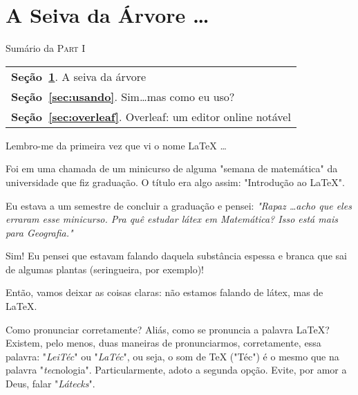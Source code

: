 \section{A Seiva da Árvore \ldots}\label{sec:seiva} %

\begin{margintable}\vspace{.8in}\footnotesize
  \caption{Sumário da \textsc{Part I}} 
  \medskip  
  \begin{tabularx}{\marginparwidth}{|X}
    \textbf{\sffamily \textcolor{azulUFRB}{Seção}~\ref{sec:seiva}}.    {\sffamily A seiva da árvore}                  \\
    \textbf{\sffamily \textcolor{azulUFRB}{Seção}~\ref{sec:usando}}.   {\sffamily Sim\ldots mas como eu uso?}         \\
    \textbf{\sffamily \textcolor{azulUFRB}{Seção}~\ref{sec:overleaf}}. {\sffamily Overleaf: um editor online notável} \\
  \end{tabularx}
\end{margintable}

Lembro-me da primeira vez que vi o nome \LaTeX{} \ldots

Foi em uma chamada de um minicurso de alguma "semana de matemática" da 
universidade que fiz graduação.
O título era algo assim: "Introdução ao \LaTeX".

Eu estava a um semestre de concluir a graduação e pensei: 
\textit{
  "Rapaz \ldots acho que eles erraram esse minicurso. 
  Pra quê estudar látex em Matemática? 
  Isso está mais para Geografia."
}

Sim! 
Eu pensei que estavam falando daquela substância espessa e branca que sai de 
algumas plantas (seringueira, por exemplo)!

Então, vamos deixar as coisas claras: não estamos falando de látex, mas de \LaTeX.

\begin{atencao}{Como pronunciar corretamente?}{\exclamacao}
  Aliás, como se pronuncia a palavra \LaTeX?\\
  Existem, pelo menos, duas maneiras de pronunciarmos, corretamente, essa palavra:
  "\textit{LeiTéc}" ou "\textit{LaTéc}", ou seja, o som de \TeX{} ("Téc") é o 
  mesmo que na palavra "\textit{tec}nologia". 
  Particularmente, adoto a segunda opção.
  Evite, por amor a Deus, falar "\textit{Látecks}".
\end{atencao}


